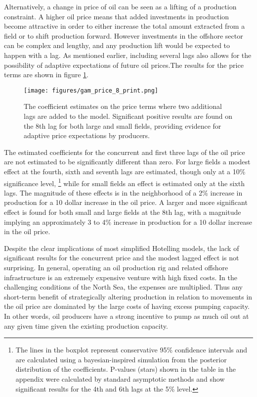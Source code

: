 \documentclass[12pt]{article}
\begin{document}
Alternatively, a change in price of oil can be seen as a lifting of a production constraint.  A higher oil price means that added investments in production become attractive in order to either increase the total amount extracted from a field or to shift production forward.  However investments in the offshore sector can be complex and lengthy, and any production lift would be expected to happen with a lag.  As mentioned earlier, including several lags also allows for the possibility of adaptive expectations of future oil prices.The results for the price terms are shown in figure \ref{gam_price_8}.

\begin{figure}
	\texttt{[image: figures/gam\_price\_8\_print.png]}
	\caption{The coefficient estimates on the price terms where two additional lags are added to the model.  Significant positive results are found on the 8th lag for both large and small fields, providing evidence for adaptive price expectations by producers.}
	\label{gam_price_8}
\end{figure}
 

The estimated coefficients for the concurrent and first three lags of the oil price are not estimated to be significantly different than zero.  For large fields a modest effect at the fourth, sixth and seventh lags are estimated, though only at a 10\% significance level, \footnote{The lines in the boxplot represent conservative 95\% confidence intervals and are calculated using a bayesian-inspired simulation from the posterior distribution of the coefficients.  P-values (stars) shown in the table in the appendix were calculated by standard asymptotic methods and show significant results for the 4th and 6th lags at the 5\% level.} while for small fields an effect is estimated only at the sixth lags. The magnitude of these effects is in the neighborhood of a 2\% increase in production for a 10 dollar increase in the oil price.  A larger and more significant effect is found for both small and large fields at the 8th lag, with a magnitude implying an approximately 3 to 4\% increase in production for a 10 dollar increase in the oil price.  

Despite the clear implications of most simplified Hotelling models, the lack of significant results for the concurrent price and the modest lagged effect is not surprising. In general, operating an oil production rig and related offshore infrastructure is an extremely expensive venture with high fixed costs.  In the challenging conditions of the North Sea, the expenses are multiplied.  Thus any short-term benefit of strategically altering production in relation to movements in the oil price are dominated by the large costs of having excess pumping capacity.  In other words, oil producers have a strong incentive to pump as much oil out at any given time given the existing production capacity.
\end{document}
